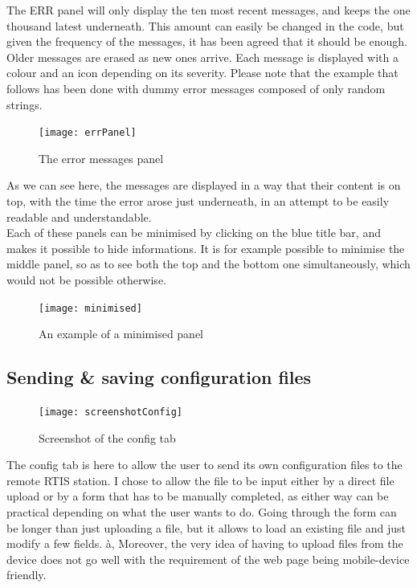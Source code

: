 \documentclass{themeensg}
\begin{document}
The ERR panel will only display the ten most recent messages, and keeps the one thousand latest underneath. This amount can easily be changed in the code, but given the frequency of the messages, it has been agreed that it should be enough. Older messages are erased as new ones arrive. Each message is displayed with a colour and an icon depending on its severity. Please note that the example that follows has been done with dummy error messages composed of only random strings.\\

\begin{figure}[ht]
	\centering
	\texttt{[image: errPanel]}
	\caption{The error messages panel}
\end{figure}

As we can see here, the messages are displayed in a way that their content is on top, with the time the error arose just underneath, in an attempt to be easily readable and understandable.\\

Each of these panels can be minimised by clicking on the blue title bar, and makes it possible to hide informations. It is for example possible to minimise the middle panel, so as to see both the top and the bottom one simultaneously, which would not be possible otherwise.\\

\begin{figure}[hb]
	\centering
	\texttt{[image: minimised]}
	\caption{An example of a minimised panel}
\end{figure}


\newpage
\subsection{Sending \& saving configuration files}

\begin{figure}[ht]
	\centering
	\texttt{[image: screenshotConfig]}
	\caption{Screenshot of the config tab}
\end{figure}


The config tab is here to allow the user to send its own configuration files to the remote RTIS station. I chose to allow the file to be input either by a direct file upload or by a form that has to be manually completed, as either way can be practical depending on what the user wants to do. Going through the form can be longer than just uploading a file, but it allows to load an existing file and just modify a few fields. à, Moreover, the very idea of having to upload files from the device does not go well with the requirement of the web page being mobile-device friendly.\\
\end{document}
